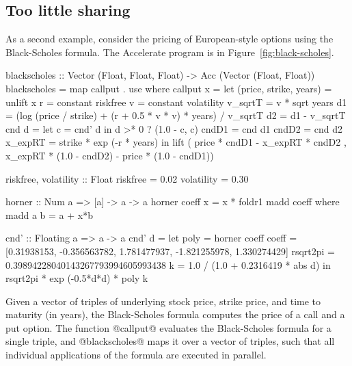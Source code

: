 \subsection{Too little sharing}

As a second example, consider the pricing of European-style options using the Black-Scholes formula. The Accelerate program is in Figure~\ref{fig:black-scholes}.
%
\begin{figure*}
\hspace*{-2ex}\begin{minipage}{.55\textwidth}
\begin{code}
blackscholes :: Vector (Float, Float, Float) 
             -> Acc (Vector (Float, Float))
blackscholes = map callput . use
  where
  callput x =
    let (price, strike, years) = unlift x
        r       = constant riskfree
        v       = constant volatility
        v_sqrtT = v * sqrt years
        d1      = (log (price / strike) + 
                  (r + 0.5 * v * v) * years) / v_sqrtT
        d2      = d1 - v_sqrtT
        cnd d   = let c = cnd' d in d >* 0 ? (1.0 - c, c)
        cndD1   = cnd d1
        cndD2   = cnd d2
        x_expRT = strike * exp (-r * years)
    in
    lift ( price * cndD1 - x_expRT * cndD2
         , x_expRT * (1.0 - cndD2) - price * (1.0 - cndD1))
\end{code}
\end{minipage}
\begin{minipage}{.5\textwidth}
\begin{code}
riskfree, volatility :: Float
riskfree   = 0.02
volatility = 0.30

horner :: Num a => [a] -> a -> a
horner coeff x = x * foldr1 madd coeff
  where
    madd a b = a + x*b

cnd' :: Floating a => a -> a
cnd' d =
  let poly     = horner coeff
      coeff    = [0.31938153, -0.356563782, 
                  1.781477937, -1.821255978, 
                  1.330274429]
      rsqrt2pi = 0.39894228040143267793994605993438
      k        = 1.0 / (1.0 + 0.2316419 * abs d)
  in
  rsqrt2pi * exp (-0.5*d*d) * poly k
\end{code}
\end{minipage}
  \caption{Black-Scholes option pricing in Accelerate}
  \label{fig:black-scholes}
\end{figure*}
%
Given a vector of triples of underlying stock price, strike price, and time to maturity (in years), the Black-Scholes formula computes the price of a call and a put option. The function @callput@ evaluates the Black-Scholes formula for a single triple, and @blackscholes@ maps it over a vector of triples, such that all individual applications of the formula are executed in parallel.

